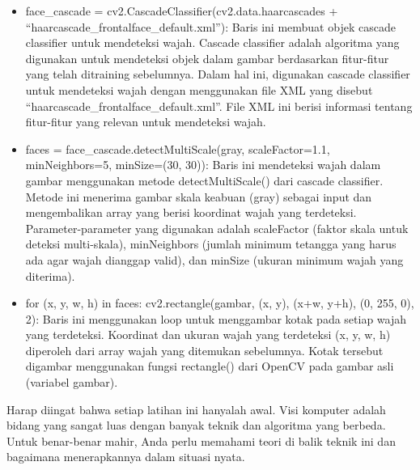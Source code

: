 \documentclass[
  letterpaper,
  DIV=11,
  numbers=noendperiod]{scrreprt}
\begin{document}
\begin{tcolorbox}[enhanced jigsaw, opacityback=0, colbacktitle=quarto-callout-tip-color!10!white, breakable, titlerule=0mm, left=2mm, toptitle=1mm, rightrule=.15mm, leftrule=.75mm, colback=white, opacitybacktitle=0.6, arc=.35mm, toprule=.15mm, coltitle=black, colframe=quarto-callout-tip-color-frame, bottomtitle=1mm, title=\textcolor{quarto-callout-tip-color}{\faLightbulb}\hspace{0.5em}{Penjelasan Kode}, bottomrule=.15mm]

\begin{itemize}
\item
  face\_cascade = cv2.CascadeClassifier(cv2.data.haarcascades +
  ``haarcascade\_frontalface\_default.xml''): Baris ini membuat objek
  cascade classifier untuk mendeteksi wajah. Cascade classifier adalah
  algoritma yang digunakan untuk mendeteksi objek dalam gambar
  berdasarkan fitur-fitur yang telah ditraining sebelumnya. Dalam hal
  ini, digunakan cascade classifier untuk mendeteksi wajah dengan
  menggunakan file XML yang disebut
  ``haarcascade\_frontalface\_default.xml''. File XML ini berisi
  informasi tentang fitur-fitur yang relevan untuk mendeteksi wajah.
\item
  faces = face\_cascade.detectMultiScale(gray, scaleFactor=1.1,
  minNeighbors=5, minSize=(30, 30)): Baris ini mendeteksi wajah dalam
  gambar menggunakan metode detectMultiScale() dari cascade classifier.
  Metode ini menerima gambar skala keabuan (gray) sebagai input dan
  mengembalikan array yang berisi koordinat wajah yang terdeteksi.
  Parameter-parameter yang digunakan adalah scaleFactor (faktor skala
  untuk deteksi multi-skala), minNeighbors (jumlah minimum tetangga yang
  harus ada agar wajah dianggap valid), dan minSize (ukuran minimum
  wajah yang diterima).
\item
  for (x, y, w, h) in faces: cv2.rectangle(gambar, (x, y), (x+w, y+h),
  (0, 255, 0), 2): Baris ini menggunakan loop untuk menggambar kotak
  pada setiap wajah yang terdeteksi. Koordinat dan ukuran wajah yang
  terdeteksi (x, y, w, h) diperoleh dari array wajah yang ditemukan
  sebelumnya. Kotak tersebut digambar menggunakan fungsi rectangle()
  dari OpenCV pada gambar asli (variabel gambar).\\
\end{itemize}

\end{tcolorbox}

Harap diingat bahwa setiap latihan ini hanyalah awal. Visi komputer
adalah bidang yang sangat luas dengan banyak teknik dan algoritma yang
berbeda. Untuk benar-benar mahir, Anda perlu memahami teori di balik
teknik ini dan bagaimana menerapkannya dalam situasi nyata.
\end{document}
